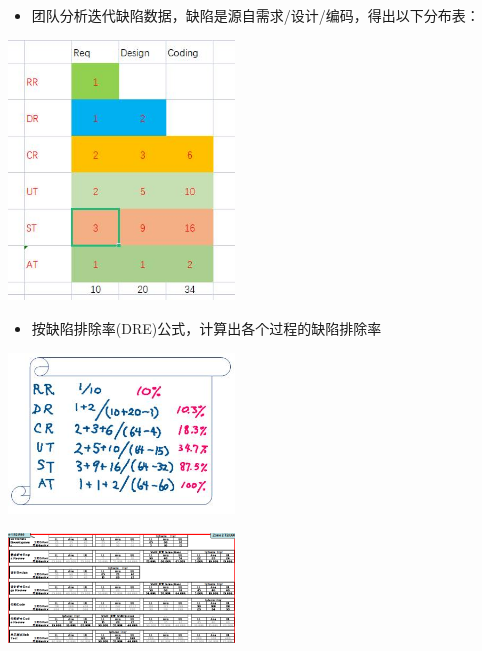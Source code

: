 \begin{itemize}
\tightlist
\item
  团队分析迭代缺陷数据，缺陷是源自需求/设计/编码，得出以下分布表：
\end{itemize}

\includegraphics[width=6cm]{微信截图_20220316093044.jpg}

\begin{itemize}
\tightlist
\item
  按缺陷排除率(DRE)公式，计算出各个过程的缺陷排除率
\end{itemize}


\includegraphics[width=6cm]{2DreEstimateScreenshot_2021-12-01_2120491.jpg}

\includegraphics[width=6cm]{sjb1.PNG}




